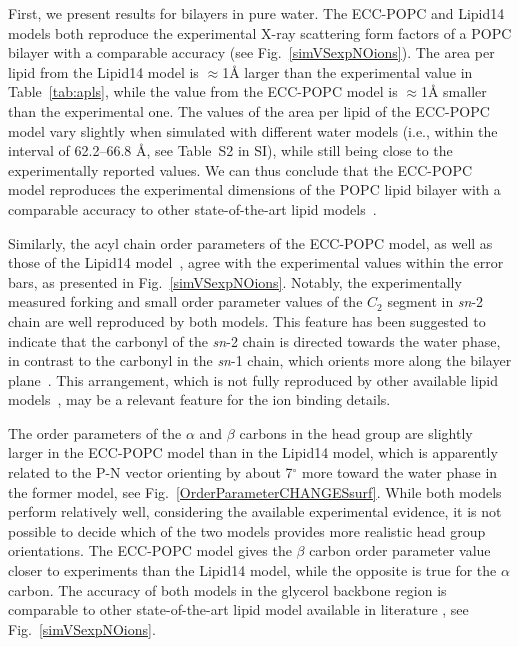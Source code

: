 \documentclass[journal=jpcbfk,manuscript=article]{achemso}
\begin{document}
First, we present results for bilayers in pure water.
The ECC-POPC and Lipid14 models both reproduce the experimental X-ray scattering form factors
of a POPC bilayer with a comparable accuracy (see Fig.~\ref{simVSexpNOions}).
The area per lipid from the Lipid14 model is $\approx$1\AA{} larger than the
experimental value in Table~\ref{tab:apls}, while the value from the ECC-POPC model
is $\approx$1\AA{} smaller than the experimental one.
The values of the area per lipid of the ECC-POPC model vary slightly
when simulated with different water models (i.e., within the interval of 62.2--66.8 \AA{}, see Table~S2 in SI),
while still being close to the experimentally reported values.
We can thus conclude that the ECC-POPC model reproduces the experimental dimensions of the POPC
lipid bilayer with a comparable accuracy to other state-of-the-art lipid models~\cite{ollila16}.


Similarly, the acyl chain order parameters of the ECC-POPC model, as well as those of the Lipid14 model~\cite{dickson14}, agree with the experimental values within the error bars, as presented in Fig.~\ref{simVSexpNOions}. Notably, the experimentally measured forking and small order parameter values of the $C_2$ segment in {\it sn}-2 chain are well reproduced by both models. This feature has been suggested to indicate that the carbonyl of the {\it sn}-2 chain is directed towards the water phase, in contrast to the carbonyl in the {\it sn}-1 chain, which orients more along the bilayer plane~\cite{seelig75,schindler75,gawrisch92}.
This arrangement, which is not fully reproduced by other available lipid models~\cite{ollila16}, may be a relevant feature for the ion binding details.

The order parameters of the $\alpha$ and $\beta$ carbons in the head group are slightly larger in the ECC-POPC model than in the Lipid14 model, which is apparently related to the P-N vector orienting by about 7$^{\circ}$ more toward the water phase in the former model, see Fig.~\ref{OrderParameterCHANGESsurf}. While both models perform relatively well, considering the available experimental evidence, it is not possible to decide which of the two models provides more realistic head group orientations. The ECC-POPC model gives the $\beta$ carbon order parameter value closer to experiments than the Lipid14 model, while the opposite is true for the $\alpha$ carbon. The accuracy of both models in the glycerol backbone region is comparable to other state-of-the-art lipid model available in literature \cite{botan15}, see Fig.~\ref{simVSexpNOions}.
\end{document}
